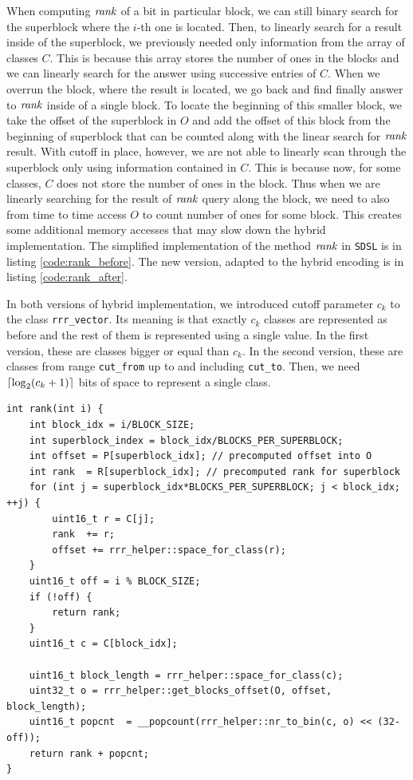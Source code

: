 When computing $\mathit{rank}$ of a bit in particular block, we can still binary search for
the superblock where the $i$-th one is located. Then, to linearly search for a result
inside of the superblock, we previously needed only information from the array of classes $C$.
This is because this array stores the number of ones in the blocks and we can linearly
search for the answer using successive entries of $C$. When we overrun the block, where
the result is located, we go back and find finally answer to $\mathit{rank}$ inside of a single
block. To locate the beginning of this smaller block, we take the offset of the superblock
in $O$ and add the offset of this block from the beginning of superblock that can be
counted along with the linear search for $\mathit{rank}$ result. With cutoff in place, however,
we are not able to linearly scan through the superblock only using information contained
in $C$. This is because now, for some classes, $C$ does not store the number of ones in
the block. Thus when we are linearly searching for the result of $\mathit{rank}$ query along the
block, we need to also from time to time access $O$ to count number of ones for some block.
This creates some additional memory accesses that may slow down the hybrid implementation.
The simplified implementation of the method $\mathit{rank}$ in \texttt{SDSL} is in listing \ref{code:rank_before}.
The new version, adapted to the hybrid encoding is in listing \ref{code:rank_after}.

In both versions of hybrid implementation, we introduced cutoff parameter $c_k$ to the
class \texttt{rrr\_vector}. Its meaning is that exactly $c_k$ classes are represented
as before and the rest of them is represented using a single value. In the first version,
these are classes bigger or equal than $c_k$. In the second version, these are classes
from range \texttt{cut\_from} up to and including \texttt{cut\_to}. Then, we need
$\left\lceil \log_2(c_k+1) \right\rceil$ bits of space to represent a single class.

\begin{lstlisting}
int rank(int i) {
	int block_idx = i/BLOCK_SIZE;
	int superblock_index = block_idx/BLOCKS_PER_SUPERBLOCK;
	int offset = P[superblock_idx]; // precomputed offset into O
	int rank  = R[superblock_idx]; // precomputed rank for superblock
	for (int j = superblock_idx*BLOCKS_PER_SUPERBLOCK; j < block_idx; ++j) {
		uint16_t r = C[j];
		rank  += r;
		offset += rrr_helper::space_for_class(r);
	}
	uint16_t off = i % BLOCK_SIZE;
	if (!off) {
		return rank;
	}
	uint16_t c = C[block_idx];

	uint16_t block_length = rrr_helper::space_for_class(c);
	uint32_t o = rrr_helper::get_blocks_offset(O, offset, block_length);
	uint16_t popcnt  = __popcount(rrr_helper::nr_to_bin(c, o) << (32-off));
	return rank + popcnt;
}
\end{lstlisting}

